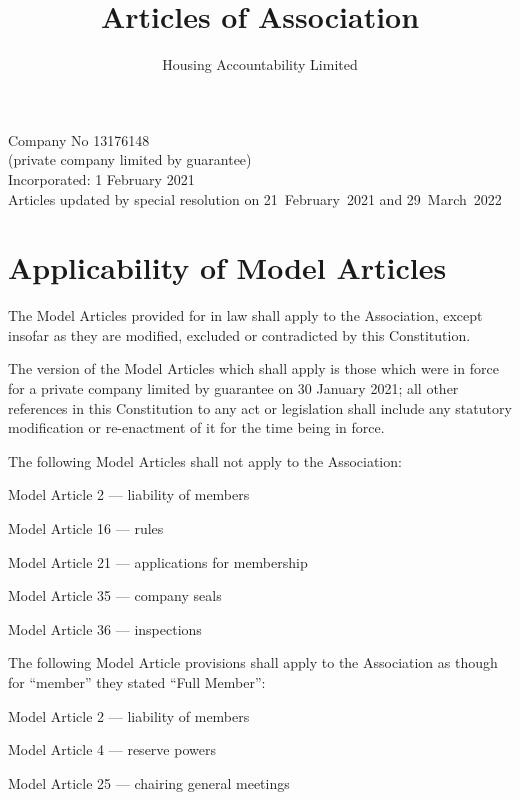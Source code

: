 \documentclass[10pt]{mk-articles-of-association}
\newcommand{\Name}[0]{Housing Accountability Limited}
\begin{document}
\title{
Articles of Association\\
}
\author{\Name{}\\
}
\date{}

\maketitle

\begin{center}
Company No 13176148\\
(private company limited by guarantee)\\
\medskip
Incorporated: 1 February 2021 \\
\medskip
Articles updated by special resolution on 21~February~2021 and 29~March~2022
\end{center}



\section{Applicability of Model Articles}

\begin{constenum}

\item The Model Articles provided for in law shall apply to the
  Association, except insofar as they are modified, excluded or
  contradicted by this Constitution.

\item The version of the Model Articles which shall apply is those
  which were in force for a private company limited by guarantee on
  30 January 2021; all other references in this Constitution
  to any act or legislation shall include any statutory modification
  or re-enactment of it for the time being in force.

\item The following Model Articles shall not apply to the Association:
  \begin{constenum}
  \item Model Article 2 --- liability of members
  \item Model Article 16 --- rules
  \item Model Article 21 --- applications for membership
  \item Model Article 35 --- company seals
  \item Model Article 36 --- inspections
  \end{constenum}

\item The following Model Article provisions shall apply to the Association
  as though for ``member'' they stated ``Full Member'':

  \begin{constenum}
  \item Model Article 2 --- liability of members
  \item Model Article 4 --- reserve powers
  \item Model Article 25 --- chairing general meetings
  \end{constenum}

\end{constenum}
\end{document}
